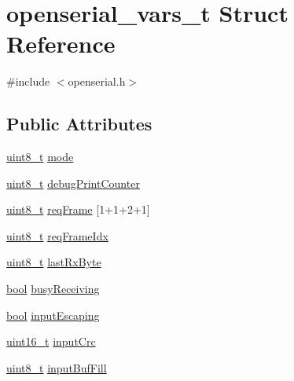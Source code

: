\hypertarget{structopenserial__vars__t}{}\section{openserial\+\_\+vars\+\_\+t Struct Reference}
\label{structopenserial__vars__t}


{\ttfamily \#include $<$openserial.\+h$>$}

\subsection*{Public Attributes}
\begin{DoxyCompactItemize}
\item 
\hyperlink{_p_e___types_8h_aba7bc1797add20fe3efdf37ced1182c5}{uint8\+\_\+t} \hyperlink{structopenserial__vars__t_a71151ab892016901a4f04fa9e49bdbfc}{mode}
\item 
\hyperlink{_p_e___types_8h_aba7bc1797add20fe3efdf37ced1182c5}{uint8\+\_\+t} \hyperlink{structopenserial__vars__t_a4d8bec569e88e606f5ffbd39783a4402}{debug\+Print\+Counter}
\item 
\hyperlink{_p_e___types_8h_aba7bc1797add20fe3efdf37ced1182c5}{uint8\+\_\+t} \hyperlink{structopenserial__vars__t_a7a7e14173525bd203f08e5292b9104c8}{req\+Frame} \mbox{[}1+1+2+1\mbox{]}
\item 
\hyperlink{_p_e___types_8h_aba7bc1797add20fe3efdf37ced1182c5}{uint8\+\_\+t} \hyperlink{structopenserial__vars__t_ae32c72c80c2d713890283c8423a2d91c}{req\+Frame\+Idx}
\item 
\hyperlink{_p_e___types_8h_aba7bc1797add20fe3efdf37ced1182c5}{uint8\+\_\+t} \hyperlink{structopenserial__vars__t_a490a0001d5d18d0d01e9f4f8b2880afa}{last\+Rx\+Byte}
\item 
\hyperlink{_p_e___types_8h_a97a80ca1602ebf2303258971a2c938e2}{bool} \hyperlink{structopenserial__vars__t_a2e727be840a75735e52424e968c24111}{busy\+Receiving}
\item 
\hyperlink{_p_e___types_8h_a97a80ca1602ebf2303258971a2c938e2}{bool} \hyperlink{structopenserial__vars__t_a06bbb4b990500c313f8fd318e1e4ffd1}{input\+Escaping}
\item 
\hyperlink{_p_e___types_8h_a1f1825b69244eb3ad2c7165ddc99c956}{uint16\+\_\+t} \hyperlink{structopenserial__vars__t_ae9d06517c761400ca0062ae1cf56c340}{input\+Crc}
\item 
\hyperlink{_p_e___types_8h_aba7bc1797add20fe3efdf37ced1182c5}{uint8\+\_\+t} \hyperlink{structopenserial__vars__t_a227eee14af7a774ffd5bf46f8d667b81}{input\+Buf\+Fill}

\end{DoxyCompactItemize}
